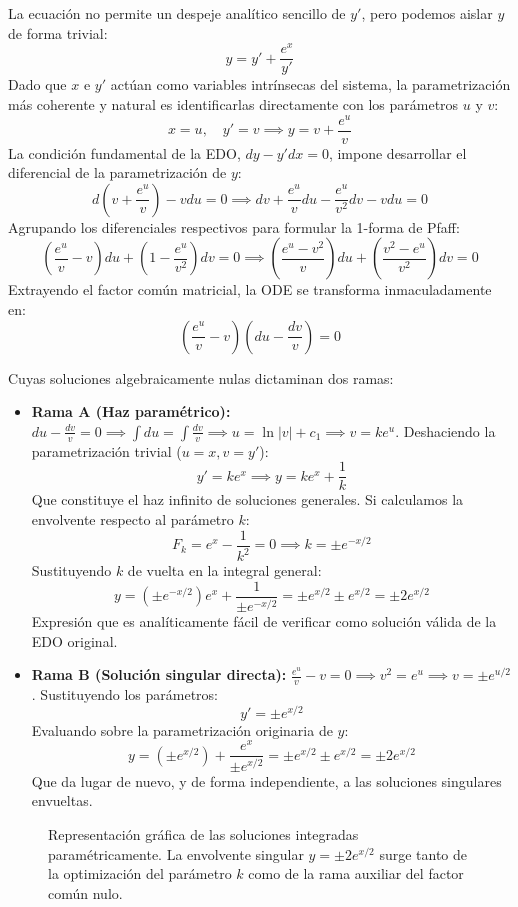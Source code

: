 \begin{tcolorbox}
La ecuación no permite un despeje analítico sencillo de $y'$, pero podemos aislar $y$ de forma trivial:
$$ y = y' + \frac{e^x}{y'} $$
Dado que $x$ e $y'$ actúan como variables intrínsecas del sistema, la parametrización más coherente y natural es identificarlas directamente con los parámetros $u$ y $v$:
$$ x = u, \quad y' = v \implies y = v + \frac{e^u}{v} $$
La condición fundamental de la EDO, $dy - y'dx = 0$, impone desarrollar el diferencial de la parametrización de $y$:
$$ d\left(v + \frac{e^u}{v}\right) - v du = 0 \implies dv + \frac{e^u}{v}du - \frac{e^u}{v^2}dv - v du = 0 $$
Agrupando los diferenciales respectivos para formular la 1-forma de Pfaff:
$$ \left( \frac{e^u}{v} - v \right)du + \left( 1 - \frac{e^u}{v^2} \right)dv = 0 \implies \left( \frac{e^u - v^2}{v} \right)du + \left( \frac{v^2 - e^u}{v^2} \right)dv = 0 $$
Extrayendo el factor común matricial, la ODE se transforma inmaculadamente en:
$$ \left( \frac{e^u}{v} - v \right) \left( du - \frac{dv}{v} \right) = 0 $$

Cuyas soluciones algebraicamente nulas dictaminan dos ramas:
\begin{itemize}
    \item \textbf{Rama A (Haz paramétrico):} $du - \frac{dv}{v} = 0 \implies \int du = \int \frac{dv}{v} \implies u = \ln|v| + c_1 \implies v = k e^u$.
    Deshaciendo la parametrización trivial ($u=x, v=y'$):
    $$ y' = k e^x \implies y = k e^x + \frac{1}{k} $$
    Que constituye el haz infinito de soluciones generales. Si calculamos la envolvente respecto al parámetro $k$:
    $$ F_k = e^x - \frac{1}{k^2} = 0 \implies k = \pm e^{-x/2} $$
    Sustituyendo $k$ de vuelta en la integral general:
    $$ y = (\pm e^{-x/2})e^x + \frac{1}{\pm e^{-x/2}} = \pm e^{x/2} \pm e^{x/2} = \pm 2e^{x/2} $$
    Expresión que es analíticamente fácil de verificar como solución válida de la EDO original.

    \item \textbf{Rama B (Solución singular directa):} $\frac{e^u}{v} - v = 0 \implies v^2 = e^u \implies v = \pm e^{u/2}$.
    Sustituyendo los parámetros:
    $$ y' = \pm e^{x/2} $$
    Evaluando sobre la parametrización originaria de $y$:
    $$ y = (\pm e^{x/2}) + \frac{e^x}{\pm e^{x/2}} = \pm e^{x/2} \pm e^{x/2} = \pm 2e^{x/2} $$
    Que da lugar de nuevo, y de forma independiente, a las soluciones singulares envueltas.
\end{itemize}

\begin{figure}[H]
    \centering
    
    \caption{Representación gráfica de las soluciones integradas paramétricamente. La envolvente singular $y=\pm 2e^{x/2}$ surge tanto de la optimización del parámetro $k$ como de la rama auxiliar del factor común nulo.}
\end{figure}
\end{tcolorbox}

